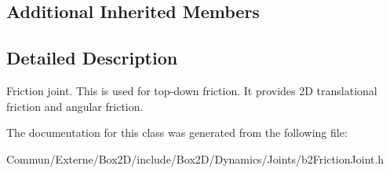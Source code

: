 \subsection*{Additional Inherited Members}


\subsection{Detailed Description}
Friction joint. This is used for top-\/down friction. It provides 2D translational friction and angular friction. 

The documentation for this class was generated from the following file\+:\begin{DoxyCompactItemize}
\item 
Commun/\+Externe/\+Box2\+D/include/\+Box2\+D/\+Dynamics/\+Joints/b2\+Friction\+Joint.\+h\end{DoxyCompactItemize}
